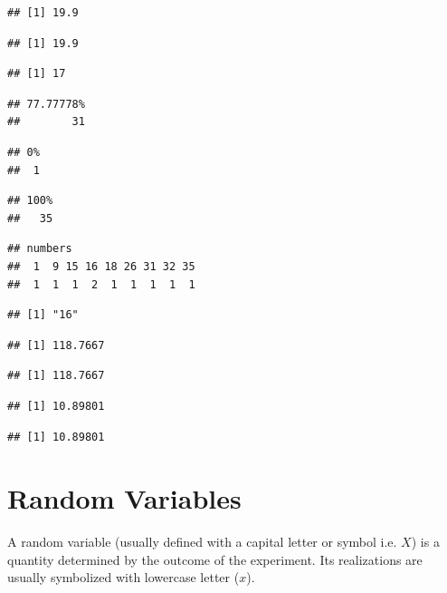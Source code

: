 \documentclass[]{book}
\theoremstyle{definition}
\theoremstyle{definition}
\theoremstyle{definition}
\theoremstyle{remark}
\begin{document}
\begin{verbatim}
## [1] 19.9
\end{verbatim}

\begin{verbatim}
## [1] 19.9
\end{verbatim}

\begin{verbatim}
## [1] 17
\end{verbatim}

\begin{verbatim}
## 77.77778% 
##        31
\end{verbatim}

\begin{verbatim}
## 0% 
##  1
\end{verbatim}

\begin{verbatim}
## 100% 
##   35
\end{verbatim}

\begin{verbatim}
## numbers
##  1  9 15 16 18 26 31 32 35 
##  1  1  1  2  1  1  1  1  1
\end{verbatim}

\begin{verbatim}
## [1] "16"
\end{verbatim}

\begin{verbatim}
## [1] 118.7667
\end{verbatim}

\begin{verbatim}
## [1] 118.7667
\end{verbatim}

\begin{verbatim}
## [1] 10.89801
\end{verbatim}

\begin{verbatim}
## [1] 10.89801
\end{verbatim}

\hypertarget{random-variables}{%
\section{Random Variables}\label{random-variables}}

A random variable (usually defined with a capital letter or symbol i.e.
\(X\)) is a quantity determined by the outcome of the experiment. Its
realizations are usually symbolized with lowercase letter (\(x\)).
\end{document}
